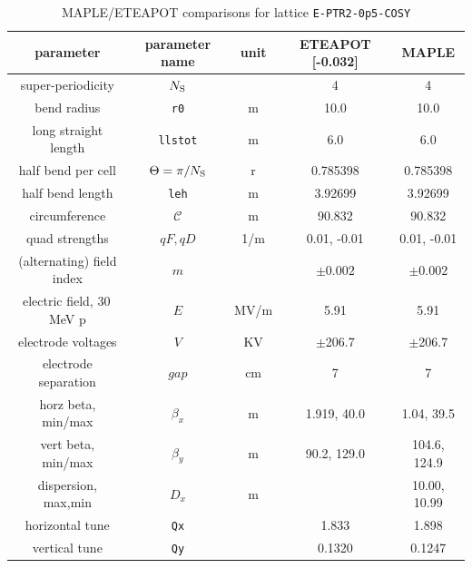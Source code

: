 \documentclass[]{article}
\begin{document}
%
\begin{table}[hbp]\small %
\caption{\label{tbl:0p5}MAPLE/ETEAPOT comparisons for 
lattice {\tt E-PTR2-0p5-COSY}} 
\medskip
\centering
\begin{tabular}{|c|c|c|c|c|}           \hline
parameter            & parameter name         & unit & ETEAPOT [-0.032] &    MAPLE      \\ \hline
super-periodicity    &  $N_{\rm S}$             &     &      4       &       4       \\
bend radius          &  {\tt r0}              &  m   &    10.0     &     10.0      \\
long straight length &  {\tt llstot}          &  m   &     6.0     &      6.0      \\
half bend per cell   &  $\Theta=\pi/N_{\rm S}$ &  r    &  0.785398   & 0.785398      \\
half bend length     & {\tt leh}              &  m   &   3.92699   &  3.92699      \\
circumference        & $\mathcal{C}$          &  m   &   90.832    &  90.832       \\
quad strengths       & $qF,qD$                & 1/m  & 0.01, -0.01 & 0.01, -0.01   \\ 
(alternating) field index &  $m$              &      &  $\pm0.002$ & $\pm0.002$    \\  \hline
electric field, 30\,MeV p & $E$                    & MV/m &   5.91      &   5.91        \\
electrode voltages   & $V$                    & KV   & $\pm$206.7  & $\pm$206.7     \\
electrode separation & $gap$                  & cm   &     7       &      7        \\  \hline
horz beta, min/max   & $\beta_x$              &  m   & 1.919, 40.0  & 1.04, 39.5   \\ 
vert beta, min/max   & $\beta_y$              &  m   & 90.2, 129.0  & 104.6, 124.9 \\ 
dispersion, max,min  & $D_x$                  &  m   &              & 10.00, 10.99 \\
horizontal tune      &  {\tt Qx}              &      &   1.833      &    1.898     \\ 
vertical tune        &  {\tt Qy}              &      &   0.1320     &    0.1247    \\
\hline
\end{tabular}
%

\end{table}
\end{document}
